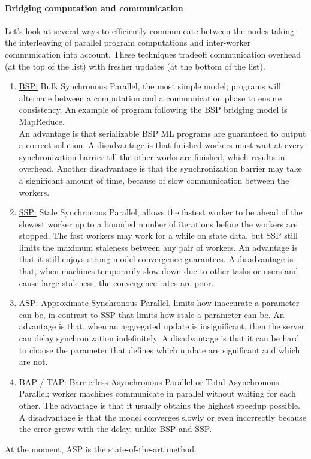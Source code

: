 \paragraph{Bridging computation and communication}
Let's look at several ways to efficiently communicate between the nodes taking the interleaving of parallel program computations and inter-worker communication into account. These techniques tradeoff communication overhead (at the top of the list) with fresher updates (at the bottom of the list).
\begin{enumerate}
	\item \underline{BSP:} Bulk Synchronous Parallel, the most simple model; programs will alternate between a computation and a communication phase to ensure consistency\cite{Xing16}. An example of program following the BSP bridging model is MapReduce.\\
	An advantage is that serializable BSP ML programs are guaranteed to output a correct solution. A disadvantage is that finished workers must wait at every synchronization barrier till the other works are finished, which results in overhead\cite{Chilimbi14}. Another disadvantage is that the synchronization barrier may take a significant amount of time, because of slow communication between the workers.
	\item \underline{SSP:} Stale Synchronous Parallel, allows the fastest worker to be ahead of the slowest worker up to a bounded number of iterations before the workers are stopped. The fast workers may work for a while on state data, but SSP still limits the maximum staleness between any pair of workers. An advantage is that it still enjoys strong model convergence guarantees. A disadvantage is that, when machines temporarily slow down due to other tasks or users and cause large staleness, the convergence rates are poor.
	\item \underline{ASP:} Approximate Synchronous Parallel, limits how inaccurate a parameter can be, in contrast to SSP that limits how stale a parameter can be. An advantage is that, when an aggregated update is insignificant, then the server can delay synchronization indefinitely. A disadvantage is that it can be hard to choose the parameter that defines which update are significant and which are not. \cite{Hsieh17}
	\item \underline{BAP / TAP:} Barrierless Asynchronous Parallel\cite{Han15} or Total Asynchronous Parallel\cite{Hsieh17}; worker machines communicate in parallel without waiting for each other. The advantage is that it usually obtains the highest speedup possible. A disadvantage is that the model converges slowly or even incorrectly because the error grows with the delay, unlike BSP and SSP. \cite{Han15}
\end{enumerate}
At the moment, ASP is the state-of-the-art method.


